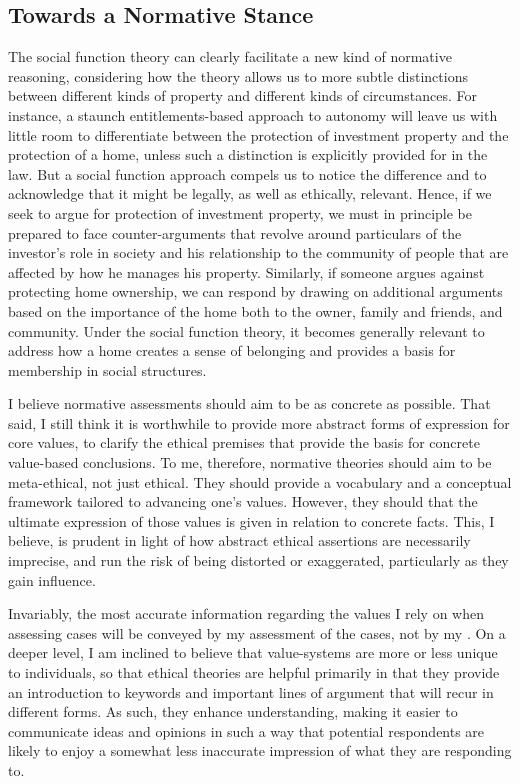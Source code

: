 \subsection{Towards a Normative Stance}

The social function theory can clearly facilitate a new kind of normative reasoning, considering how the theory allows us to  more subtle distinctions between different kinds of property and different kinds of circumstances. For instance, a staunch entitlements-based approach to autonomy will leave us with little room to differentiate between the protection of investment property and the protection of a home, unless such a distinction is explicitly provided for in the law. But a social function approach compels us to notice the difference and to acknowledge that it might be legally, as well as ethically, relevant. Hence, if we seek to argue for protection of investment property, we must in principle be prepared to face counter-arguments that revolve around particulars of the investor's role in society and his relationship to the community of people that are affected by how he manages his property. Similarly, if someone argues against protecting home ownership, we can respond by drawing on additional arguments based on the importance of the home both to the owner,  family and friends, and  community. Under the social function theory, it becomes generally relevant to address how a home creates a sense of belonging and provides a basis for membership in social structures.

I believe normative assessments should aim to be as concrete as possible. That said, I still think it is worthwhile to provide more abstract forms of expression for core values, to clarify the ethical premises that provide the basis for concrete value-based conclusions. To me, therefore, normative theories should aim to be meta-ethical, not just ethical. They should provide a vocabulary and a conceptual framework tailored to advancing one's values. However, they should  that the ultimate expression of those values is given in relation to concrete facts. This, I believe, is prudent in light of how abstract ethical assertions are necessarily imprecise, and run the risk of being distorted or exaggerated, particularly as they gain influence.

Invariably, the most accurate information regarding the values I rely on when assessing cases will be conveyed by my assessment of the cases, not by my . On a deeper level, I am inclined to believe that value-systems are more or less unique to individuals, so that ethical theories are helpful primarily in that they provide an introduction to keywords and important lines of argument that will recur in different forms. As such, they enhance understanding, making it easier to communicate ideas and opinions in such a way that potential respondents are likely to enjoy a somewhat less inaccurate impression of what they are responding to. 

